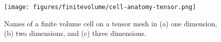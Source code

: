 \begin{figure}[ht]
    \centering
    \texttt{[image: figures/finitevolume/cell-anatomy-tensor.png]}
    \caption{Names of a finite volume cell on a tensor mesh in (a) one dimension, (b) two dimensions, and (c) three dimensions.}
    \label{fig:finitevolume-cell-anatomy-tensor}
\end{figure}
